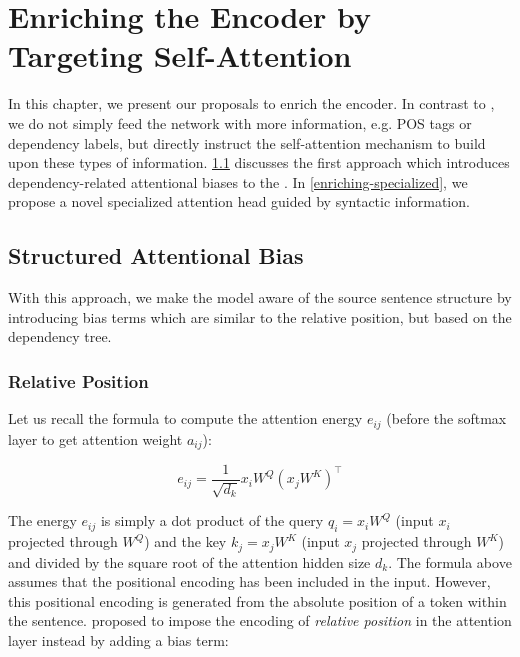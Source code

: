 \chapter{Enriching the Encoder by Targeting Self-Attention}
\label{enriching}

In this chapter, we present our proposals to enrich the encoder.
In contrast to \citeauthor{sennrich2016linguistic}, we do not simply feed the network with more information, e.g. POS tags or dependency labels, but directly instruct the self-attention mechanism to build upon these types of information. \cref{enriching-structure} discusses the first approach which introduces dependency-related attentional biases to the \transformer. In \cref{enriching-specialized}, we propose a novel specialized attention head guided by syntactic information.

\section{Structured Attentional Bias}
\label{enriching-structure}

With this approach, we make the \transformer model aware of the source sentence structure by introducing bias terms which are similar to the relative position, but based on the dependency tree.

\subsection{Relative Position}
\label{enriching-structure-relative}

Let us recall the formula to compute the attention energy $e_{ij}$ (before the softmax layer to get attention weight $a_{ij}$):

\begin{equation}
    e_{ij}=\frac{1}{\sqrt{d_k}} x_i W^Q (x_j W^K)^\top
\end{equation}

The energy $e_{ij}$ is simply a dot product of the query $q_i=x_i W^Q$ (input $x_i$ projected through $W^Q$) and the key $k_j=x_j W^K$ (input $x_j$ projected through $W^K$) and divided by the square root of the attention hidden size $d_k$.
The formula above assumes that the positional encoding has been included in the input.
However, this positional encoding is generated from the absolute position of a token within the sentence. \cite{DBLP:conf/naacl/ShawUV18} proposed to impose the encoding of \textit{relative position} in the attention layer instead by adding a bias term:

